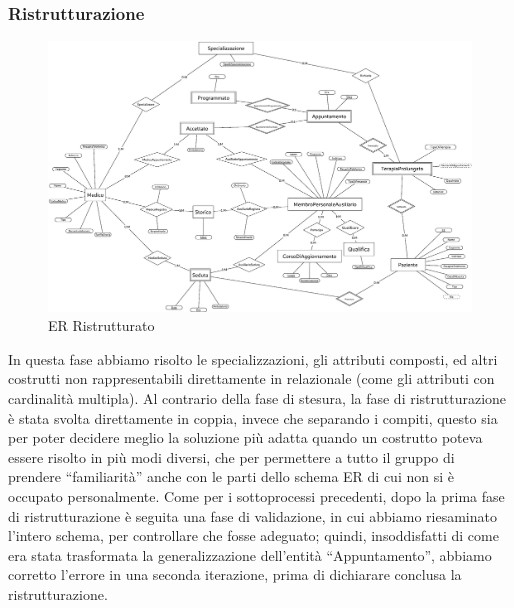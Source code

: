 \documentclass[11pt]{article}
\begin{document}
\subsubsection{Ristrutturazione}
\begin{figure}[H]
    \includegraphics[width=\linewidth]{images/ER_Ristrutturato2.png}
    \caption{ER Ristrutturato}
    \label{fig:ER_Ristrutturato}
\end{figure}
In questa fase abbiamo risolto le specializzazioni, gli attributi composti, ed altri costrutti non rappresentabili direttamente in relazionale (come gli attributi con cardinalità multipla). Al contrario della fase di stesura, la fase di ristrutturazione è stata svolta direttamente in coppia, invece che separando i compiti, questo sia per poter decidere meglio la soluzione più adatta quando un costrutto poteva essere risolto in più modi diversi, che per permettere a tutto il gruppo di prendere ``familiarità'' anche con le parti dello schema ER di cui non si è occupato personalmente.
Come per i sottoprocessi precedenti, dopo la prima fase di ristrutturazione è seguita una fase di validazione, in cui abbiamo riesaminato l'intero schema, per controllare che fosse adeguato; quindi, insoddisfatti di come era stata trasformata la generalizzazione dell'entità ``Appuntamento'', abbiamo corretto l'errore in una seconda iterazione, prima di dichiarare conclusa la ristrutturazione.
\end{document}
